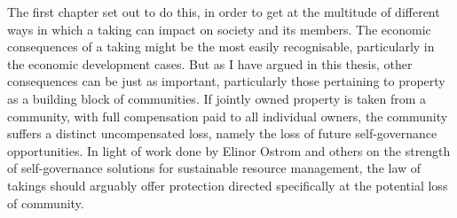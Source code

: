 {%



The first chapter set out to do this, in order to get at the multitude of different ways in which a taking can impact on society and its members. The economic consequences of a taking might be the most easily recognisable, particularly in the economic development cases. But as I have argued in this thesis, other consequences can be just as important, particularly those pertaining to property as a building block of communities. If jointly owned property is taken from a community, with full compensation paid to all individual owners, the community suffers a distinct uncompensated loss, namely the loss of future self-governance opportunities. In light of work done by Elinor Ostrom and others on the strength of self-governance solutions for sustainable resource management, the law of takings should arguably offer protection directed specifically at the potential loss of community.



}
